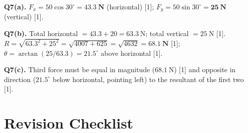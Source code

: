 \begin{markscheme}
\vspace{0.5em}\textbf{Q7(a).} $F_x = 50\cos30^\circ = \mathbf{43.3\ \text{N}}$ (horizontal) [1]; $F_y = 50\sin30^\circ = \mathbf{25\ \text{N}}$ (vertical) [1].

\vspace{0.5em}\textbf{Q7(b).} Total horizontal $= 43.3 + 20 = 63.3\ \text{N}$; total vertical $= 25\ \text{N}$ [1]. $R = \sqrt{63.3^2 + 25^2} = \sqrt{4007 + 625} = \sqrt{4632} = \mathbf{68.1\ \text{N}}$ [1]; $\theta = \arctan(25/63.3) = \mathbf{21.5^\circ}$ above horizontal [1].

\vspace{0.5em}\textbf{Q7(c).} Third force must be equal in magnitude ($68.1\ \text{N}$) [1] and opposite in direction ($21.5^\circ$ below horizontal, pointing left) to the resultant of the first two [1].

\end{markscheme}

\newpage
\section{Revision Checklist}


